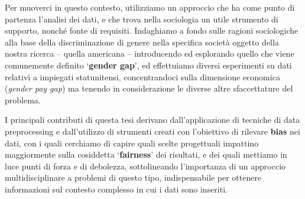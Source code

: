 Per muoverci in questo contesto, utilizziamo un approccio che ha come punto di partenza l'analisi dei dati, e che trova nella sociologia un utile strumento di supporto, nonch\'e fonte di requisiti. Indaghiamo a fondo sulle ragioni sociologiche alla base della discriminazione di genere nella specifica societ\`a oggetto della nostra ricerca -- quella americana -- introducendo ed esplorando quello che viene comunemente definito `\textbf{gender gap}', ed effettuiamo diversi esperimenti su dati relativi a impiegati statunitensi, concentrandoci sulla dimensione economica (\textit{gender pay gap}) ma tenendo in considerazione le diverse altre sfaccettature del problema.

I principali contributi di questa tesi derivano dall'applicazione di tecniche di data preprocessing e dall'utilizzo di strumenti creati con l'obiettivo di rilevare \textbf{bias} nei dati, con i quali cerchiamo di capire quali scelte progettuali impattino maggiormente sulla cosiddetta `\textbf{fairness}' dei risultati, e dei quali mettiamo in luce punti di forza e di debolezza, sottolineando l'importanza di un approccio multidisciplinare a problemi di questo tipo, indispensabile per ottenere informazioni sul contesto complesso in cui i dati sono inseriti.

